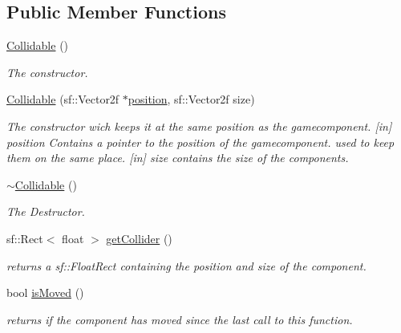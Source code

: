 \subsection*{Public Member Functions}
\begin{DoxyCompactItemize}
\item 
\hyperlink{class_collidable_a92ce9e2b08086bb2f466168ffc69c9ed}{Collidable} ()
\begin{DoxyCompactList}\small\item\em The constructor. \end{DoxyCompactList}\item 
\hyperlink{class_collidable_a71a242ba63c157ca40acbf4421c0eaf7}{Collidable} (sf\-::\-Vector2f $\ast$\hyperlink{class_collidable_aa6c2e113d920df8c0d5da2a244f924bd}{position}, sf\-::\-Vector2f size)
\begin{DoxyCompactList}\small\item\em The constructor wich keeps it at the same position as the gamecomponent. \mbox{[}in\mbox{]} position Contains a pointer to the position of the gamecomponent. used to keep them on the same place. \mbox{[}in\mbox{]} size contains the size of the components. \end{DoxyCompactList}\item 
\hyperlink{class_collidable_a454ca1b66dd504b25fed3706914cee6e}{$\sim$\-Collidable} ()
\begin{DoxyCompactList}\small\item\em The Destructor. \end{DoxyCompactList}\item 
sf\-::\-Rect$<$ float $>$ \hyperlink{class_collidable_ae28c60e857bf31a5eeebd4972341a0a7}{get\-Collider} ()
\begin{DoxyCompactList}\small\item\em returns a sf\-::\-Float\-Rect containing the position and size of the component. \end{DoxyCompactList}\item 
bool \hyperlink{class_collidable_a8cc1f09ce02e6fcf56d98f07f908a104}{is\-Moved} ()
\begin{DoxyCompactList}\small\item\em returns if the component has moved since the last call to this function. \end{DoxyCompactList}\end{DoxyCompactItemize}
